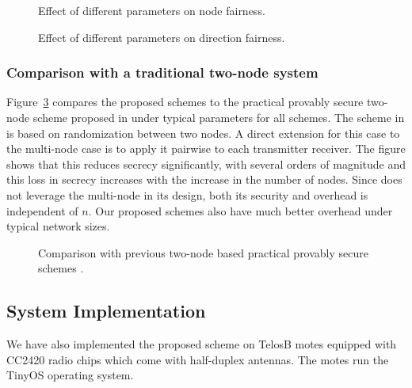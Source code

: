 \documentclass[10pt,letterpaper,conference]{IEEEtran}
\begin{document}
\begin{figure}[!t]
\centering
{}
\caption{Effect of different parameters on node fairness.}
\label{fig:fairness_node}
\end{figure}

\begin{figure}[!t]
\centering
{}
\caption{Effect of different parameters on direction fairness.}
\label{fig:fairness_dir}
\end{figure}

\subsubsection{Comparison with a traditional two-node system}
Figure~\ref{fig:compare} compares the proposed schemes to the practical provably
secure two-node scheme proposed in \cite{Elmorsy} under typical parameters for
all schemes. The scheme in \cite{Elmorsy} is based on randomization between two
nodes. A direct extension for this case to the multi-node case is to apply it
pairwise to each transmitter receiver. The figure shows that this reduces
secrecy significantly, with several orders of magnitude and this loss in secrecy
increases with the increase in the number of nodes. Since \cite{Elmorsy} does
not leverage the multi-node in its design, both its security and overhead is
independent of $n$. Our proposed schemes also have much better overhead under
typical network sizes.

\begin{figure}[!t]
  \centering
\caption{Comparison with previous two-node based practical provably secure
schemes \cite{Elmorsy}.}
  \label{fig:compare}
\end{figure}

\subsection{System Implementation}
We have also implemented the proposed scheme on TelosB motes equipped with CC2420 radio chips which come with
half-duplex antennas. The motes run the TinyOS operating system.
\end{document}
